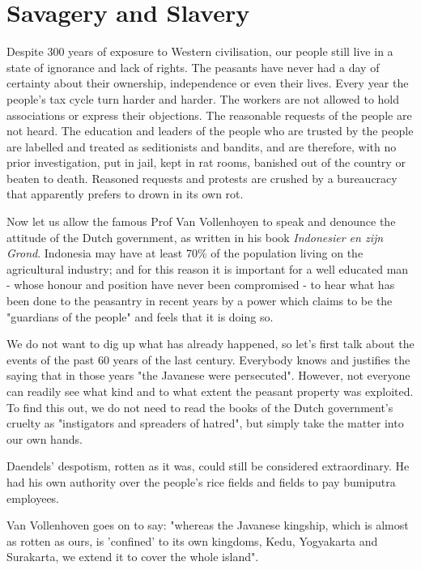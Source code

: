 \section{Savagery and Slavery}

Despite 300 years of exposure to Western civilisation, our people still live 
in a state of ignorance and lack of rights. The peasants have never had a day 
of certainty about their ownership, independence or even their lives. Every year 
the people's tax cycle turn harder and harder. The workers are not allowed to 
hold associations or express their objections. The reasonable requests of the 
people are not heard. The education and leaders of the people who are trusted 
by the people are labelled and treated as seditionists and bandits, and are 
therefore, with no prior investigation, put in jail, kept in rat rooms, 
banished out of the country or beaten to death. Reasoned requests and protests 
are crushed by a bureaucracy that apparently prefers to drown in its own rot.\vskip 0.2in

Now let us allow the famous Prof Van Vollenhoyen to speak and 
denounce the attitude of the Dutch government, as written in his 
book \emph{Indonesier en zijn Grond}. Indonesia may have at least 70\% of 
the population living on the agricultural industry; and for this reason it is important 
for a well educated man - whose honour and position have never been compromised - 
to hear what has been done to the peasantry in recent years by a power which claims 
to be the "guardians of the people" and feels that it is doing so.\vskip 0.2in

We do not want to dig up what has already happened, so let's first talk about the events of 
the past 60 years of the last century. Everybody knows and justifies the saying that in 
those years "the Javanese were persecuted". However, not everyone can readily see what kind 
and to what extent the peasant property was exploited. To find this out, we do not need to 
read the books of the Dutch government's cruelty as "instigators and spreaders of hatred", but simply take the matter into our own hands.\vskip 0.2in

Daendels' despotism, rotten as it was, could still be considered extraordinary. 
He had his own authority over the people's rice fields and fields to pay bumiputra employees.\vskip 0.2in

Van Vollenhoven goes on to say: 
"whereas the Javanese kingship, which is almost as rotten as ours, is 'confined' to its own kingdoms, Kedu, 
Yogyakarta and Surakarta, we extend it to cover the whole island".\vskip 0.2in

